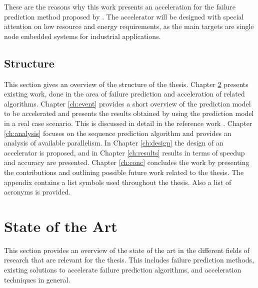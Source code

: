 \documentclass[mscthesis]{usiinfthesis}
\begin{document}
These are the reasons why this work presents an acceleration for the failure
prediction method proposed by \cite{salfner08}. The accelerator will be designed
with special attention on low resource and energy requirements, as the main
targets are single node embedded systems for industrial applications.

\section{Structure}
\label{ch:intro_struct}

This section gives an overview of the structure of the thesis. Chapter
\ref{ch:art} presents existing work, done in the area of failure prediction and
acceleration of related algorithms. Chapter \ref{ch:event} provides a short
overview of the prediction model to be accelerated and presents the results
obtained by using the prediction model in a real case scenario. This is
discussed in detail in the reference work \cite{salfner08}. Chapter
\ref{ch:analysis} focuses on the sequence prediction algorithm and provides an
analysis of available parallelism. In Chapter \ref{ch:design} the design of an
accelerator is proposed, and in Chapter \ref{ch:results} results in terms of
speedup and accuracy are presented. Chapter \ref{ch:conc} concludes the work
by presenting the contributions and outlining possible future work related to
the thesis. The appendix contains a list symbols used throughout the thesis.
Also a list of acronyms is provided.

\chapter{State of the Art}
\label{ch:art}
\glsresetall %

This section provides an overview of the state of the art in the different
fields of research that are relevant for the thesis. This includes failure
prediction methods, existing solutions to accelerate failure prediction
algorithms, and acceleration techniques in general.

\end{document}
